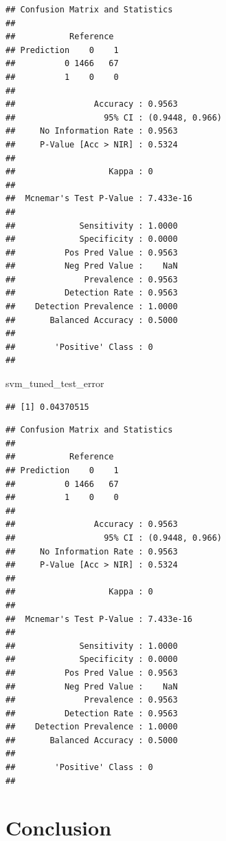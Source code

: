 \documentclass[
]{article}
\newenvironment{Shaded}{\begin{snugshade}}{\end{snugshade}}
\newcommand{\CommentTok}[1]{\textcolor[rgb]{0.56,0.35,0.01}{\textit{#1}}}
\newcommand{\FunctionTok}[1]{\textcolor[rgb]{0.00,0.00,0.00}{#1}}
\newcommand{\NormalTok}[1]{#1}
\newcommand{\SpecialCharTok}[1]{\textcolor[rgb]{0.00,0.00,0.00}{#1}}
\renewcommand{\=}[1]{\stackrel{#1}{=}}
\theoremstyle{definition}
\theoremstyle{remark}
\begin{document}
\begin{verbatim}
## Confusion Matrix and Statistics
## 
##           Reference
## Prediction    0    1
##          0 1466   67
##          1    0    0
##                                          
##                Accuracy : 0.9563         
##                  95% CI : (0.9448, 0.966)
##     No Information Rate : 0.9563         
##     P-Value [Acc > NIR] : 0.5324         
##                                          
##                   Kappa : 0              
##                                          
##  Mcnemar's Test P-Value : 7.433e-16      
##                                          
##             Sensitivity : 1.0000         
##             Specificity : 0.0000         
##          Pos Pred Value : 0.9563         
##          Neg Pred Value :    NaN         
##              Prevalence : 0.9563         
##          Detection Rate : 0.9563         
##    Detection Prevalence : 1.0000         
##       Balanced Accuracy : 0.5000         
##                                          
##        'Positive' Class : 0              
## 
\end{verbatim}

\begin{Shaded}
\begin{Highlighting}[]
\NormalTok{svm\_tuned\_test\_error}
\end{Highlighting}
\end{Shaded}

\begin{verbatim}
## [1] 0.04370515
\end{verbatim}

\begin{Shaded}
\end{Shaded}

\begin{verbatim}
## Confusion Matrix and Statistics
## 
##           Reference
## Prediction    0    1
##          0 1466   67
##          1    0    0
##                                          
##                Accuracy : 0.9563         
##                  95% CI : (0.9448, 0.966)
##     No Information Rate : 0.9563         
##     P-Value [Acc > NIR] : 0.5324         
##                                          
##                   Kappa : 0              
##                                          
##  Mcnemar's Test P-Value : 7.433e-16      
##                                          
##             Sensitivity : 1.0000         
##             Specificity : 0.0000         
##          Pos Pred Value : 0.9563         
##          Neg Pred Value :    NaN         
##              Prevalence : 0.9563         
##          Detection Rate : 0.9563         
##    Detection Prevalence : 1.0000         
##       Balanced Accuracy : 0.5000         
##                                          
##        'Positive' Class : 0              
## 
\end{verbatim}

\hypertarget{conclusion}{%
\section{Conclusion}\label{conclusion}}

\newpage
\end{document}
